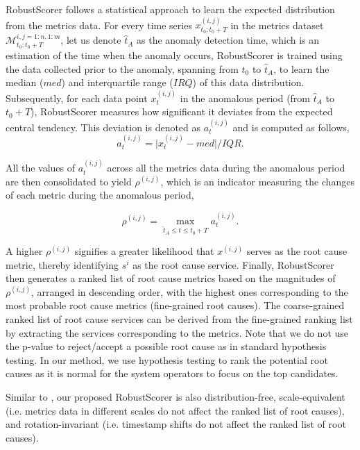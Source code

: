 RobustScorer follows a statistical approach to learn the expected distribution from the metrics data. For every time series $x^{(i,j)}_{t_0:t_0+T}$ in the metrics dataset $\mathcal{M}^{i,j=1:n,1:m}_{t_0:t_0+T}$, let us denote $\hat{t}_A$ as the anomaly detection time, which is an estimation of the time when the anomaly occurs, RobustScorer is trained using the data collected prior to the anomaly, spanning from $t_0$ to $\hat{t}_A$, to learn the median ($med$) and interquartile range ($IRQ$) of this data distribution. Subsequently, for each data point $x^{(i,j)}_t$ in the anomalous period (from $\hat{t}_A$ to $t_0+T$), RobustScorer measures how significant it deviates from the expected central tendency. This deviation is denoted as $a^{(i,j)}_t$ and is computed as follows,
\begin{equation} \label{eq:robust-scoring-1}
    a^{(i,j)}_t = \big | x^{(i,j)}_t - med \big | / IQR.
\end{equation}

All the values of $a^{(i,j)}_t$ across all the metrics data during the anomalous period are then consolidated to yield $\rho^{(i, j)}$, which is an indicator measuring the changes of each metric during the anomalous period,

\begin{equation} \label{eq:robust-scoring-2}
    \rho^{(i, j)} = \max_{\hat{t}_A \leq t \leq t_0+T} a^{(i, j)}_t.
\end{equation}


A higher $\rho^{(i, j)}$ signifies a greater likelihood that $x^{(i, j)}$ serves as the root cause metric, thereby identifying $s^i$ as the root cause service. Finally, RobustScorer then generates a ranked list of root cause metrics based on the magnitudes of $\rho^{(i, j)}$, 
arranged in descending order, with the highest ones corresponding to the most probable root cause metrics (fine-grained root causes). The coarse-grained ranked list of root cause services can be derived from the fine-grained ranking list by extracting the services corresponding to the metrics. Note that we do not use the p-value to reject/accept a possible root cause as in standard hypothesis testing. In our method, we use hypothesis testing to rank the potential root causes as it is normal for the system operators to focus on the top candidates.


Similar to \cite{Li2022Circa, Shan2019Ediagnosis}, our proposed RobustScorer is also distribution-free, scale-equivalent (i.e. metrics data in different scales do not affect the ranked list of root causes), and rotation-invariant (i.e. timestamp shifts do not affect the ranked list of root causes).



